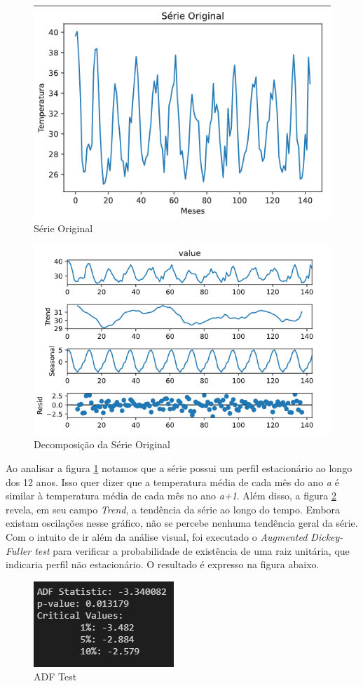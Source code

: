 \documentclass[12pt]{article}
\begin{document}
	\begin{figure}[H]
		\centering
		\includegraphics[width=0.7\linewidth]{Imagens/serieoriginal/plotserie}
		\caption{Série Original}
		\label{fig:plotserie}
	\end{figure}
	\begin{figure}[H]
		\centering
		\includegraphics[width=0.7\linewidth]{Imagens/serieoriginal/decomposeSerie}
		\caption{Decomposição da Série Original}
		\label{fig:decomposeserie}
	\end{figure}

	Ao analisar a figura \ref{fig:plotserie} notamos que a série possui um perfil estacionário ao longo dos 12 anos. Isso quer dizer que a temperatura média de cada mês do ano \textit{a} é similar à temperatura média de cada mês no ano \textit{a+1}. Além disso, a figura \ref{fig:decomposeserie} revela, em seu campo \textit{Trend}, a tendência da série ao longo do tempo. Embora existam oscilações nesse gráfico, não se percebe nenhuma tendência geral da série. Com o intuito de ir além da análise visual, foi executado o \textit{Augmented Dickey-Fuller test} para verificar a probabilidade de existência de uma raiz unitária, que indicaria perfil não estacionário. O resultado é expresso na figura abaixo.
	\begin{figure}[H]
		\centering
		\includegraphics[width=0.5\linewidth]{Imagens/serieoriginal/asfteste}
		\caption{ADF Test}
		\label{fig:asfteste}
	\end{figure}
	
\end{document}
